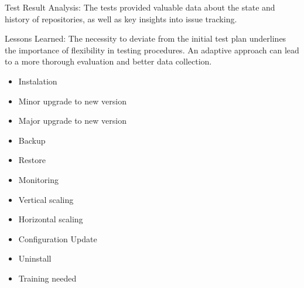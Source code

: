 Test Result Analysis: The tests provided valuable data about the state and history of repositories, as well as key insights into issue tracking.

Lessons Learned: The necessity to deviate from the initial test plan underlines the importance of flexibility in testing procedures. An adaptive approach can lead to a more thorough evaluation and better data collection.




\begin{itemize}
    \item Instalation
    \item Minor upgrade to new version
    \item Major upgrade to new version
    \item Backup
    \item Restore
    \item Monitoring
    \item Vertical scaling
    \item Horizontal scaling
    \item Configuration Update
    \item Uninstall
    \item Training needed
\end{itemize}

